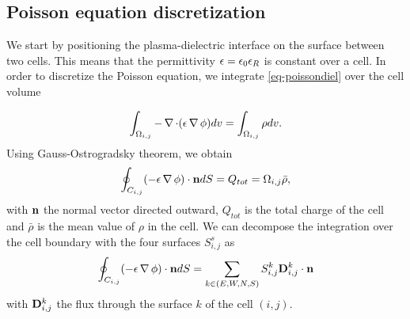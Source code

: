   \subsection{Poisson equation discretization}

    We start by positioning the plasma-dielectric interface on the surface between two cells.
    This means that the permittivity $\epsilon = \epsilon_0 \epsilon_{R}$ is  constant over a cell.
    In order to discretize the Poisson equation, we integrate \cref{eq-poissondiel} over the cell volume

    \begin{equation}
    \int_{\Omega_{i,j}} - \operatorname{{\mathbf \nabla}} \cdot (\epsilon \operatorname{{\mathbf \nabla}} \phi) dv= \int_{\Omega_{i,j}} \rho dv.
    \end{equation}
    Using Gauss-Ostrogradsky theorem, we obtain
    \begin{equation}
    \oint_{C_{i,j}} ( - \epsilon \operatorname{{\mathbf \nabla}} \phi) \cdot {\mathbf n} dS = Q_{tot} =  \Omega_{i,j} \bar{\rho},
    \end{equation}
    with ${\mathbf n}$ the normal vector directed outward, $Q_{tot}$ is the total charge of the cell and $\bar{\rho}$ is the mean value of $\rho$ in the cell.
    We can decompose the integration over the cell boundary with the four surfaces $S^s_{i,j}$ as
    \begin{equation}
      \label{eq-poissonsum}
    \oint_{C_{i,j}} (-\epsilon \operatorname{{\mathbf \nabla}} \phi) \cdot {\mathbf n} dS = \sum_{k\in(E,W,N,S)} S^k_{i,j} {\mathbf D}^k_{i,j} \cdot {\mathbf n}
    \end{equation}
    with ${\mathbf D}^k_{i,j}$ the flux through the surface $k$ of the cell $(i,j)$.


